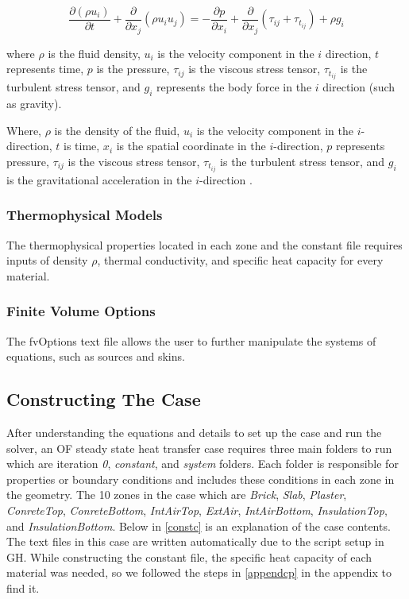 \begin{equation}
\frac{\partial (\rho u_i)}{\partial t} + \frac{\partial}{\partial x_j} \left( \rho u_i u_j \right) = -\frac{\partial p}{\partial x_i} + \frac{\partial}{\partial x_j} \left( \tau_{ij} + \tau_{t_{ij}} \right) + \rho g_i
\end{equation}

where \(\rho\) is the fluid density, \(u_i\) is the velocity component in the \(i\) direction, \(t\) represents time, \(p\) is the pressure, \(\tau_{ij}\) is the viscous stress tensor, \(\tau_{t_{ij}}\) is the turbulent stress tensor, and \(g_i\) represents the body force in the \(i\) direction (such as gravity).


Where, $\rho$ is the density of the fluid, $u_i$ is the velocity component in the $i$-direction, $t$ is time, $x_i$ is the spatial coordinate in the $i$-direction, $p$ represents pressure, $\tau_{ij}$ is the viscous stress tensor, $\tau_{t_{ij}}$ is the turbulent stress tensor, and $g_i$ is the gravitational acceleration in the $i$-direction
 \cite{cht}.


\subsubsection{Thermophysical Models}
The thermophysical properties located in each zone and the constant file requires inputs of density $\rho$, thermal conductivity, and specific heat capacity for every material.
\subsubsection{Finite Volume Options}
The fvOptions text file allows the user to further manipulate the systems of equations, such as sources and skins. 


\subsection{Constructing The Case}    
After understanding the equations and details to set up the case and run the solver, an \gls{OF} steady state heat transfer case requires three main folders to run which are iteration \textit{0}, \textit{constant}, and \textit{system} folders. Each folder is responsible for properties or boundary conditions and includes these conditions in each zone in the geometry. The 10 zones in the case which are \textit{Brick}, \textit{Slab}, \textit{Plaster}, \textit{ConreteTop}, \textit{ConreteBottom}, \textit{IntAirTop}, \textit{ExtAir}, \textit{IntAirBottom}, \textit{InsulationTop}, and \textit{InsulationBottom}. Below in \cref{constc} is an explanation of the case contents. The text files in this case are written automatically due to the script setup in \gls{GH}. While constructing the constant file, the specific heat capacity of each material was needed, so we followed the steps in \ref{appendcp} in the appendix to find it.







